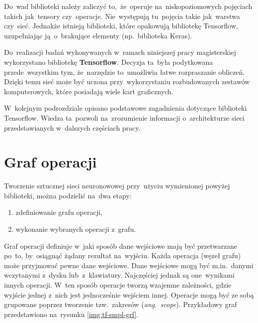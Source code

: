 Do~wad biblioteki należy zaliczyć to,~że~operuje na~niskopoziomowych pojęciach takich jak~tensory czy~operacje.
Nie~występują tu~pojęcia takie jak~warstwa czy~sieć. Jednakże istnieją biblioteki, które opakowują bibliotekę
Tensorflow, uzupełniając ją~o~brakujące elementy (np.~biblioteka Keras).

Do~realizacji badań wykonywanych w~ramach niniejszej pracy magisterskiej wykorzystano bibliotekę \textbf{Tensorflow}.
Decyzja ta~była podytkowana przede~wszystkim tym, że~narzędzie to~umożliwia łatwe rozpraszanie obliczeń. Dzięki temu
sieć może być uczona przy~wykorzystaniu rozbudowanych zestawów komputerowych, które posiadają wiele kart graficznych.

W~kolejnym podrozdziale opisano podstawowe zagadnienia dotyczące biblioteki Tensorflow. Wiedza ta~pozwoli na~zrozumienie
informacji o~architekturze sieci przedstawianych w~dalszych częściach pracy.

\section{Graf operacji}
\begin{minipage}[t]{\textwidth}
    Tworzenie sztucznej sieci neuronowowej przy~użyciu wymienionej powyżej biblioteki, można podzielić na~dwa etapy:
    \begin{enumerate}
        \item zdefiniowanie grafu operacji,
        \item wykonanie wybranych operacji z~grafu.
    \end{enumerate}
\end{minipage}

Graf operacji definiuje w~jaki sposób dane wejściowe mają być przetwarzane po~to, by~osiągnąć żądany rezultat
na~wyjściu. Każda operacja (węzeł grafu) może przyjmować pewne dane wejściowe. Dane wejściowe mogą być m.in.~danymi
wczytanymi z~dysku lub~z~klawiatury. Najczęściej jednak są one~wynikami innych operacji. W~ten sposób operacje tworzą
wzajemne zależności, gdzie wyjście jednej z~nich jest jednocześnie wejściem innej. Operacje mogą być ze sobą grupowane
poprzez tworzenie tzw.~zakresów (\textit{ang.~scope}). Przykładowy graf przedstawiono na~rysunku \ref{img:tf-smpl-grf}.

